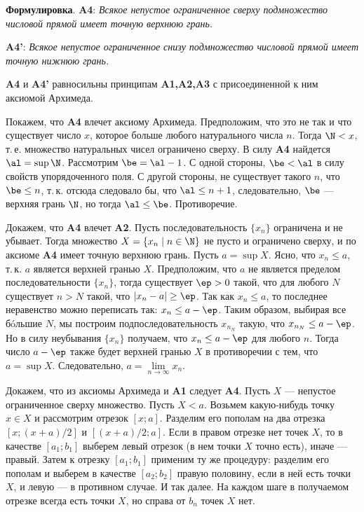 \begin{enumerate}
\noindent
\textbf{Формулировка}. {\bf A4}: \textit{Всякое непустое ограниченное сверху подмножество числовой прямой имеет точную верхнюю грань.}

\noindent
{\bf A4'}: \textit{Всякое непустое ограниченное снизу подмножество числовой прямой имеет точную нижнюю грань.}

\begin{thrm}\label{A1A4} \textbf{A4} и \textbf{A4'} равносильны принципам \textbf{A1,A2,A3} с присоединенной к ним аксиомой Архимеда.
\end{thrm}
\pf
Покажем, что \textbf{A4} влечет аксиому Архимеда. Предположим, что это не так и что существует число $x$, которое больше любого натурального числа $n$. Тогда $\N<x$, т.\,е. множество натуральных чисел ограничено сверху. В силу \textbf{A4} найдется $\al=\sup\N$. Рассмотрим $\be=\al-1$. С одной стороны, $\be<\al$ в силу свойств упорядоченного поля. С другой стороны, не существует такого $n$, что $\be\le n$, т.\,к. отсюда следовало бы, что $\al\le n+1$, следовательно, $\be$ --- верхняя грань $\N$, но тогда $\al\le\be$. Противоречие.

Докажем, что \textbf{A4} влечет \textbf{A2}. Пусть последовательность $\{x_n\}$ ограничена и не убывает. Тогда множество $X=\{x_n\mid n\in\N\}$ не пусто и ограничено сверху, и по аксиоме \textbf{A4} имеет точную верхнюю грань. Пусть $a=\sup X$. Ясно, что $x_n\le a$, т.\,к. $a$ является верхней гранью $X$. Предположим, что $a$ не является пределом последовательности $\{x_n\}$, тогда существует $\ep>0$ такой, что для любого $N$ существует $n>N$ такой, что $|x_n-a|\ge\ep$. Так как $x_n\le a$, то последнее неравенство можно переписать так: $x_n\le a-\ep$. Таким образом, выбирая все б\'oльшие $N$, мы построим подпоследовательность $x_{n_N}$ такую, что $x_{n_N}\le a-\ep$. Но в силу неубывания $\{x_n\}$ получаем, что $x_n\le a-\ep$ для любого $n$. Тогда число $a-\ep$ также будет верхней гранью $X$ в противоречии с тем, что $a=\sup X$. Следовательно, $a=\lim\limits_{n\to\infty}x_n$.

Докажем, что из аксиомы Архимеда и \textbf{A1} следует \textbf{A4}. Пусть $X$ --- непустое ограниченное сверху множество. Пусть $X<a$. Возьмем какую-нибудь точку $x\in X$ и рассмотрим отрезок $[x;a]$. Разделим его пополам на два отрезка $[x;(x+a)/2]$ и $[(x+a)/2;a]$. Если в правом отрезке нет точек $X$, то в качестве $[a_1;b_1]$ выберем левый отрезок (в нем точки $X$ точно есть), иначе --- правый. Затем к отрезку $[a_1;b_1]$ применим ту же процедуру: разделим его пополам и выберем в качестве $[a_2;b_2]$ правую половину, если в ней есть точки $X$, и левую --- в противном случае. И так далее.
На каждом шаге в получаемом отрезке всегда есть точки $X$, но справа от $b_n$ точек $X$ нет.


\end{enumerate}
